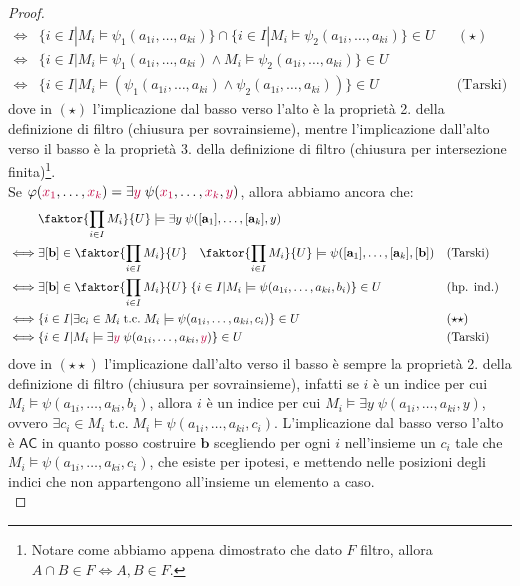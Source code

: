\begin{proof}
\begin{align*}
            \iff& \{i \in I | M_i \models \psi_1(a_{1i},\ldots,a_{ki})\} \cap \{i \in I | M_i \models \psi_2(a_{1i},\ldots,a_{ki})\} \in U && (\star)\\
            \iff& \{i \in I | M_i \models \psi_1(a_{1i},\ldots,a_{ki}) \land M_i \models \psi_2(a_{1i},\ldots,a_{ki})\} \in U \\
            \iff& \{i \in I | M_i \models (\psi_1(a_{1i},\ldots,a_{ki}) \land \psi_2(a_{1i},\ldots,a_{ki}))\} \in U && \text{(Tarski)}
        \end{align*}
    dove in $(\star)$ l'implicazione dal basso verso l'alto è la proprietà 2. della definizione di filtro (chiusura per sovrainsieme), mentre l'implicazione dall'alto verso il basso è la proprietà 3. della definizione di filtro (chiusura per intersezione finita)\footnote{Notare come abbiamo appena dimostrato che dato $F$ filtro, allora $A \cap B \in F \iff A,B \in F$.}.\\
    Se $\varphi(\textcolor{purple}{x_1},\ldots,\textcolor{purple}{x_k}) = \exists \textcolor{purple}{y} \; \psi(\textcolor{purple}{x_1},\ldots,\textcolor{purple}{x_k},\textcolor{purple}{y})$, allora abbiamo ancora che:
        \begin{align*}
            &\faktor{\prod_{i \in I} M_i}{U} \models \exists y \; \psi([\mathbf a_1],\ldots,[\mathbf a_k],y) \\
            \iff& \exists [\mathbf b] \in \faktor{\prod_{i \in I} M_i}{U} \quad \faktor{\prod_{i \in I} M_i}{U} \models \psi([\mathbf a_1],\ldots,[\mathbf a_k],[\mathbf b]) && \text{(Tarski)}\\
            \iff& \exists [\mathbf b] \in \faktor{\prod_{i \in I} M_i}{U} \; \{i \in I | M_i \models \psi(a_{1i},\ldots,a_{ki},b_i)\} \in U && \text{(hp. ind.)}\\
            \iff& \{i \in I | \exists c_i \in M_i \;\text{t.c.}\; M_i \models \psi(a_{1i},\ldots,a_{ki},c_i)\} \in U && (\star\star)\\
            \iff& \{i \in I | M_i \models \exists  \purple{y} \; \psi(a_{1i},\ldots,a_{ki},\purple{y})\} \in U && \text{(Tarski)}
        \end{align*}
        dove in $(\star\star)$ l'implicazione dall'alto verso il basso è sempre la proprietà 2. della definizione di filtro (chiusura per sovrainsieme), infatti se $i$ è un indice per cui $M_i \models \psi(a_{1i},\ldots,a_{ki},b_i)$, allora $i$ è un indice per cui $M_i \models \exists y \; \psi(a_{1i},\ldots,a_{ki},y)$, ovvero $\exists c_i \in M_i \;\text{t.c.}\; M_i \models \psi(a_{1i},\ldots,a_{ki},c_i)$.
        L'implicazione dal basso verso l'alto è $\mathsf{AC}$ in quanto posso costruire $\mathbf{b}$ scegliendo per ogni $i$ nell'insieme un $c_i$ tale che $M_i \models \psi(a_{1i},\ldots,a_{ki},c_i)$, che esiste per ipotesi, e mettendo nelle posizioni degli indici che non appartengono all'insieme un elemento a caso.\\

\end{proof}
